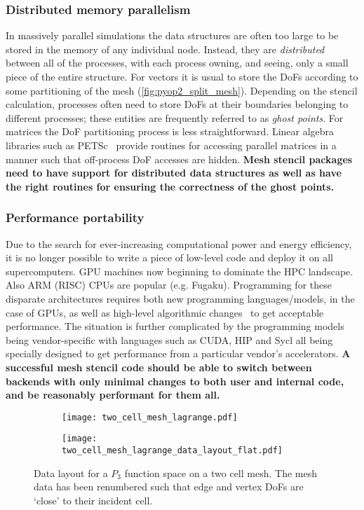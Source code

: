 \documentclass[thesis]{subfiles}
\begin{document}
\subsubsection{Distributed memory parallelism}

In massively parallel simulations the data structures are often too large to be stored in the memory of any individual node.
Instead, they are \textit{distributed} between all of the processes, with each process owning, and seeing, only a small piece of the entire structure.
For vectors it is usual to store the DoFs according to some partitioning of the mesh (\cref{fig:pyop2_split_mesh}).
Depending on the stencil calculation, processes often need to store DoFs at their boundaries belonging to different processes; these entities are frequently referred to as \textit{ghost points}.
For matrices the DoF partitioning process is less straightforward.
Linear algebra libraries such as PETSc~\cite{petsc-user-ref,petsc-web-page,petsc-efficient} provide routines for accessing parallel matrices in a manner such that off-process DoF accesses are hidden.
\textbf{Mesh stencil packages need to have support for distributed data structures as well as have the right routines for ensuring the correctness of the ghost points.}

\subsubsection{Performance portability}

Due to the search for ever-increasing computational power and energy efficiency, it is no longer possible to write a piece of low-level code and deploy it on all supercomputers.
GPU machines now beginning to dominate the HPC landscape.
Also ARM (RISC) CPUs are popular (e.g. Fugaku).
Programming for these disparate architectures requires both new programming languages/models, in the case of GPUs, as well as high-level algorithmic changes~\cite{betteridgeCodeGenerationProductive2021} to get acceptable performance.
The situation is further complicated by the programming models being vendor-specific with languages such as CUDA, HIP and Sycl all being specially designed to get performance from a particular vendor's accelerators.
\textbf{A successful mesh stencil code should be able to switch between backends with only minimal changes to both user and internal code, and be reasonably performant for them all.}

\begin{figure}
  \centering
  \begin{subfigure}{\textwidth}
    \centering
    \texttt{[image: two\_cell\_mesh\_lagrange.pdf]}
    \vspace{1em}
  \end{subfigure}
  \begin{subfigure}{\textwidth}
    \centering
    \texttt{[image: two\_cell\_mesh\_lagrange\_data\_layout\_flat.pdf]}
  \end{subfigure}
  \caption{
    Data layout for a $P_3$ function space on a two cell mesh.
    The mesh data has been renumbered such that edge and vertex DoFs are `close' to their incident cell.
  }
  \label{fig:mesh_renumbering_demo}
\end{figure}
\end{document}
